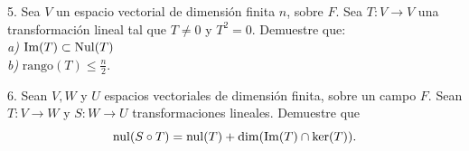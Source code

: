 \documentclass[12pt,a4paper]{article}
\begin{document}
    \vspace{0.5cm}

    5. Sea $V$ un espacio vectorial de dimensión finita $n$, sobre $F$. Sea $T:V\to V$
    una transformación lineal tal que $T\neq0$ y $T^{2}=0$. Demuestre que:\\
    \textit{a)} $\Im(T)\subset\operatorname{Nul}(T)$\\
    \textit{b)} $\text{rango}(T)\leq\frac{n}{2}$.

    \vspace{2.3cm}

    6. Sean $V,W$ y $U$ espacios vectoriales de dimensión finita, sobre un campo $F$. Sean $T:V\to W$ y $S:W\to U$ transformaciones lineales.
    Demuestre que
    \begin{equation*}
        \operatorname{nul}(S\circ T)=\operatorname{nul}(T)+\dim(\Im(T)\cap\ker(T)).
    \end{equation*}
\end{document}
